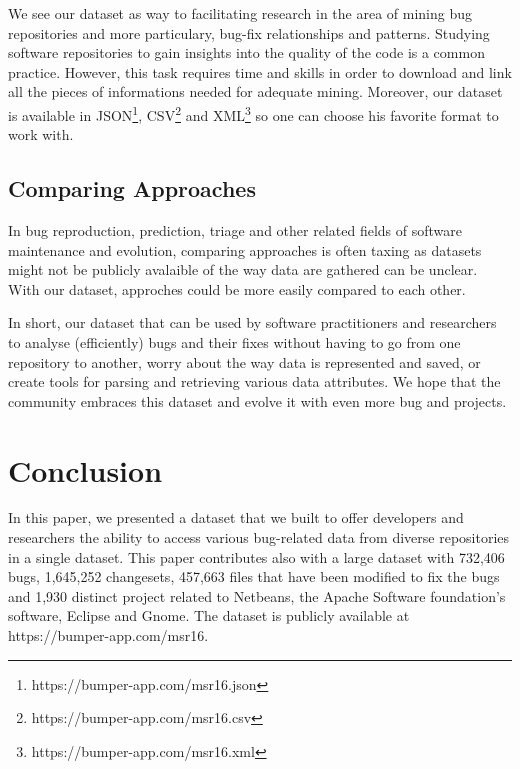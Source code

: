 \documentclass{sig-alternate-05-2015}
\begin{document}
We see our dataset as way to facilitating research in the area
of mining bug repositories and more particulary, bug-fix relationships and patterns\cite{Kim2013e,Saha2014,Martinez2014}. Studying software repositories to gain insights
into the quality of the code is a common practice.
However, this task requires
time and skills in order to download and link all the pieces of informations
needed for adequate mining. Moreover, our dataset is available in JSON\footnote{https://bumper-app.com/msr16.json}, CSV\footnote{https://bumper-app.com/msr16.csv} and XML\footnote{https://bumper-app.com/msr16.xml} so one can choose his favorite format to work with.

\subsection{Comparing Approaches}
\label{sub:Comparing Approaches}

In bug reproduction\cite{Chen2013,Nayrolles2015}, prediction\cite{Kamei2010,Bhattacharya2011}, triage\cite{Anvik2006,Jeong2009m,Kong2011} and other related fields of software maintenance and evolution, comparing approaches is often taxing as datasets might not be publicly avalaible of the way data are gathered can be unclear.
With our dataset, approches could be more easily compared to each other.

In short, our dataset that can be used by software practitioners
and researchers to analyse (efficiently) bugs and their fixes without having
to go from one repository to another, worry about the way data is represented
and saved, or create tools for parsing and retrieving various data attributes.
We hope that the community embraces this dataset and evolve it with even more bug and projects.

\section{Conclusion}
\label{sec:Conclusion}

In this paper, we presented a dataset that we built to offer developers and
researchers the ability to access various bug-related data
from diverse repositories in a single dataset. This paper
contributes also with a large dataset with 732,406 bugs,
1,645,252 changesets, 457,663 files that have been modified to fix the bugs
and 1,930 distinct project
related to Netbeans, the Apache Software foundation's
software, Eclipse and Gnome. The dataset is publicly available at https://bumper-app.com/msr16.
\end{document}
